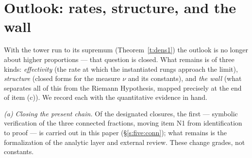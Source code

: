 \documentclass[11pt]{article}
\numberwithin{equation}{section}
\theoremstyle{definition}
\theoremstyle{remark}
\begin{document}
\section{Outlook: rates, structure, and the
wall}\label{s:outlook}

With the tower run to its supremum (Theorem~\ref{t:dens1})
the outlook is no longer about higher proportions --- that
question is closed. What remains is of three kinds:
\emph{effectivity} (the rate at which the instantiated rungs
approach the limit), \emph{structure} (closed forms for the
measure $\nu$ and its constants), and \emph{the wall} (what
separates all of this from the Riemann Hypothesis, mapped
precisely at the end of item (c)). We record each with the
quantitative evidence in hand.

\emph{(a) Closing the present chain.} Of the designated
closures, the first --- symbolic verification of the three
connected fractions, moving item N1 from identification to
proof --- is carried out in this paper (\S\ref{s:five:conn});
what remains is the formalization of the analytic layer and
external review. These change grades, not constants.
\end{document}

